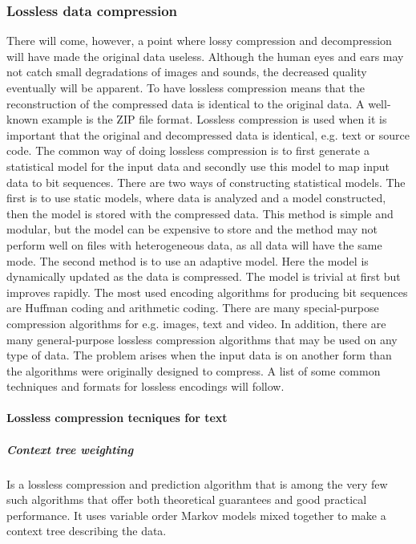 \subsubsection{Lossless data compression}
There will come, however, a point where lossy compression and decompression will have made the original data useless. Although the human eyes and ears may not catch small degradations of images and sounds, the decreased quality eventually will be apparent.
\newline
\newline
To have lossless compression means that the reconstruction of the compressed data is identical to the original data. A well-known example is the ZIP file format. Lossless compression is used when it is important that the original and decompressed data is identical, e.g. text or source code. The common way of doing lossless compression is to first generate a statistical model for the input data and secondly use this model to map input data to bit sequences. There are two ways of constructing statistical models. The first is to use static models, where data is analyzed and a model constructed, then the model is stored with the compressed data. This method is simple and modular, but the model can be expensive to store and the method may not perform well on files with heterogeneous data, as all data will have the same mode. The second method is to use an adaptive model. Here the model is dynamically updated as the data is compressed. The model is trivial at first but improves rapidly.
\newline
\newline
The most used encoding algorithms for producing bit sequences are Huffman coding and arithmetic coding. There are many special-purpose compression algorithms for e.g. images, text and video. In addition, there are many general-purpose lossless compression algorithms that may be used on any type of data. The problem arises when the input data is on another form than the algorithms were originally designed to compress.
A list of some common techniques and formats for lossless encodings will follow. \cite{bib:losslessCompression}


\paragraph{Lossless compression tecniques for text}

\subparagraph{Context tree weighting} \hfill
\newline
Is a lossless compression and prediction algorithm that is among the very few such algorithms that offer both theoretical guarantees and good practical performance. It uses variable order Markov models mixed together to make a context tree describing the data. \cite{bib:contextTreeWeighting} \cite{bib:contextTreeWeightingResearch}

